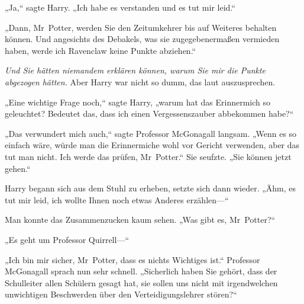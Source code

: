 „Ja,“ sagte Harry. „Ich habe es verstanden und es tut mir leid.“

„Dann, Mr~Potter, werden Sie den Zeitumkehrer bis auf Weiteres behalten können. Und angesichts des Debakels, was sie zugegebenermaßen vermieden haben, werde ich Ravenclaw keine Punkte abziehen.“

\emph{Und Sie hätten niemandem erklären können, warum Sie mir die Punkte abgezogen hätten.} Aber Harry war nicht so dumm, das laut auszusprechen.

„Eine wichtige Frage noch,“ sagte Harry, „warum hat das Erinnermich so geleuchtet? Bedeutet das, dass ich einen Vergessenszauber abbekommen habe?“

„Das verwundert mich auch,“ sagte Professor McGonagall langsam. „Wenn es so einfach wäre, würde man die Erinnermiche wohl vor Gericht verwenden, aber das tut man nicht. Ich werde das prüfen, Mr~Potter.“ Sie seufzte. „Sie können jetzt gehen.“

Harry begann sich aus dem Stuhl zu erheben, setzte sich dann wieder. „Ähm, es tut mir leid, ich wollte Ihnen noch etwas Anderes erzählen—“

Man konnte das Zusammenzucken kaum sehen. „Was gibt es, Mr~Potter?“

„Es geht um Professor Quirrell—“

„Ich bin mir sicher, Mr~Potter, dass es nichts Wichtiges ist.“ Professor McGonagall sprach nun sehr schnell. „Sicherlich haben Sie gehört, dass der Schulleiter allen Schülern gesagt hat, sie sollen uns nicht mit irgendwelchen unwichtigen Beschwerden über den Verteidigungslehrer stören?“

